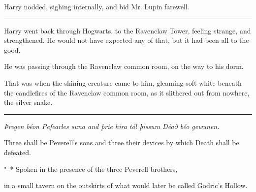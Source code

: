 Harry nodded, sighing internally, and bid Mr. Lupin farewell.

\begin{center}\rule{3in}{0.4pt}\end{center}

Harry went back through Hogwarts, to the Ravenclaw Tower, feeling
strange, and strengthened. He would not have expected any of that, but
it had been all to the good.

He was passing through the Ravenclaw common room, on the way to his
dorm.

That was when the shining creature came to him, gleaming soft white
beneath the candlefires of the Ravenclaw common room, as it slithered
out from nowhere, the silver snake.

\begin{center}\rule{3in}{0.4pt}\end{center}

\emph{Þregen béon Pefearles suna and þrie hira tól þissum Déað béo
gewunen.}

Three shall be Peverell's sons and three their devices by which Death
shall be defeated.

"--* Spoken in the presence of the three Peverell brothers,

in a small tavern on the outskirts of what would later be called
Godric's Hollow.
